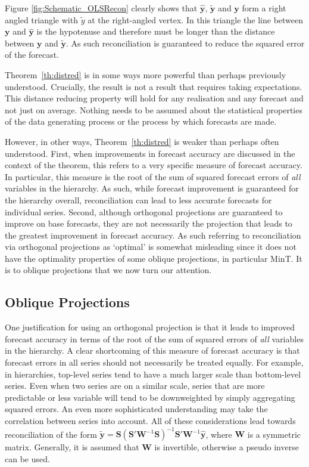 \documentclass[12pt]{article}
\theoremstyle{definition}
\theoremstyle{property}
\begin{document}
	
	Figure \ref{fig:Schematic_OLSRecon} clearly shows that $\hat{\bm{y}}$, $\tilde{\bm{y}}$ and $\bm{y}$ form a right angled triangle with $\tilde{y}$ at the right-angled vertex.  In this triangle the line between $\bm{y}$ and $\hat{\bm{y}}$ is the hypotenuse and therefore must be longer than the distance between $\bm{y}$ and $\tilde{\bm{y}}$.  As such reconciliation is guaranteed to reduce the squared error of the forecast.
	
    Theorem~\ref{th:distred} is in some ways more powerful than perhaps previously understood.  Crucially, the result is not a result that requires taking expectations.  This distance reducing property will hold for any realisation and any forecast and not just on average.  Nothing needs to be assumed about the statistical properties of the data generating process or the process by which forecasts are made.

    However, in other ways, Theorem~\ref{th:distred} is weaker than perhaps often understood. First, when improvements in forecast accuracy are discussed in the context of the theorem, this refers to a very specific measure of forecast accuracy.  In particular, this measure is the root of the sum of squared forecast errors of {\em all} variables in the hierarchy.  As such, while forecast improvement is guaranteed for the hierarchy overall, reconciliation can lead to less accurate forecasts for individual series. Second, although orthogonal projections are guaranteed to improve on base forecasts, they are not necessarily the projection that leads to the greatest improvement in forecast accuracy.  As such referring to reconciliation via orthogonal projections as `optimal' is somewhat misleading since it does not have the optimality properties of some oblique projections, in particular MinT. It is to oblique projections that we now turn our attention.
    	
	\subsection{Oblique Projections}\label{sec:oblique}
	
	One justification for using an orthogonal projection is that it leads to improved forecast accuracy in terms of the root of the sum of squared errors of {\em all} variables in the hierarchy.  A clear shortcoming of this measure of forecast accuracy is that forecast errors in all series should not necessarily be treated equally.  For example, in hierarchies, top-level series tend to have a much larger scale than bottom-level series.  Even when two series are on a similar scale, series that are more predictable or less variable will tend to be downweighted by simply aggregating squared errors.  An even more sophisticated understanding may take the correlation between series into account.  All of these considerations lead towards reconciliation of the form $\tilde{\bm{y}}=\bm{S}\left(\bm{S}'\bm{W}^{-1}\bm{S}\right)^{-1}\bm{S}'\bm{W}^{-1}\hat{\bm{y}}$, where $\bm{W}$ is a symmetric matrix.  Generally, it is assumed that $\bm{W}$ is invertible, otherwise a pseudo inverse can be used.
	
\end{document}
